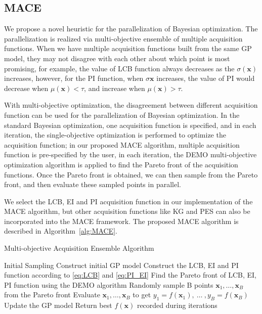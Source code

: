 \subsection{MACE}

We propose a novel heuristic for the parallelization of Bayesian optimization.
The parallelization is realized via multi-objective ensemble of multiple
acquisition functions. When we have multiple acquisition functions built from
the same GP model, they may not disagree with each other about which point is
most promising, for example, the value of LCB function always decreases as the
$\sigma(\bm{x})$ increases, however, for the PI function, when $\sigma{\bm{x}}$
increases, the value of PI would decrease when $\mu(\bm{x}) < \tau$, and
increase when $\mu(\bm{x}) > \tau$.


With multi-objective optimization, the disagreement between different
acquisition function can be used for the parallelization of Bayesian
optimization. In the standard Bayesian optimization, one acquisition function
is specified, and in each iteration, the single-objective optimization is
performed to optimize the acquisition function; in our proposed MACE algorithm,
multiple acquisition function is pre-specified by the user, in each iteration,
the DEMO multi-objective optimization algorithm is applied to find the Pareto
front of the acquisition functions. Once the Pareto front is obtained, we can
then sample from the Pareto front, and then evaluate these sampled points in
parallel.


We select the LCB, EI and PI acquisition function in our implementation of the MACE algorithm, but other acquisition functions like KG and PES can also be incorporated into the MACE framework. The proposed MACE algorithm is described in Algorithm~\ref{alg:MACE}.

\begin{algorithm}
\caption{Multi-objective Acquisition Ensemble Algorithm}
\label{alg:MACE}
\begin{algorithmic}[1]
\STATE Initial Sampling
\STATE Construct initial GP model
    \STATE Construct the LCB, EI and PI function according to \eqref{eq:LCB} and \eqref{eq:PI_EI}
    \STATE Find the Pareto front of LCB, EI, PI function using the DEMO algorithm
    \STATE Randomly sample B points $\bm{x}_1, \dots, \bm{x}_B$ from the Pareto front
    \STATE Evaluate $\bm{x}_1, \dots, \bm{x}_B$ to get $y_1 = f(\bm{x}_1),~\dots~,y_B = f(\bm{x}_B)$
    \STATE Update the GP model
\ENDFOR
\STATE Return best $f(\bm{x})$ recorded during iterations
\end{algorithmic}
\end{algorithm}
